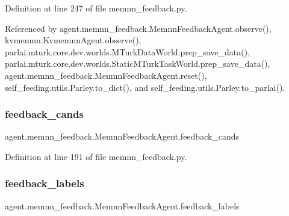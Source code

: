 Definition at line 247 of file memnn\+\_\+feedback.\+py.



Referenced by agent.\+memnn\+\_\+feedback.\+Memnn\+Feedback\+Agent.\+observe(), kvmemnn.\+Kvmemnn\+Agent.\+observe(), parlai.\+mturk.\+core.\+dev.\+worlds.\+M\+Turk\+Data\+World.\+prep\+\_\+save\+\_\+data(), parlai.\+mturk.\+core.\+dev.\+worlds.\+Static\+M\+Turk\+Task\+World.\+prep\+\_\+save\+\_\+data(), agent.\+memnn\+\_\+feedback.\+Memnn\+Feedback\+Agent.\+reset(), self\+\_\+feeding.\+utils.\+Parley.\+to\+\_\+dict(), and self\+\_\+feeding.\+utils.\+Parley.\+to\+\_\+parlai().

\mbox{\label{classagent_1_1memnn__feedback_1_1MemnnFeedbackAgent_afc6ac2b20a83a3b766a5dd985d591277}} 
\subsubsection{\texorpdfstring{feedback\+\_\+cands}{feedback\_cands}}
{\footnotesize\ttfamily agent.\+memnn\+\_\+feedback.\+Memnn\+Feedback\+Agent.\+feedback\+\_\+cands}



Definition at line 191 of file memnn\+\_\+feedback.\+py.

\mbox{\label{classagent_1_1memnn__feedback_1_1MemnnFeedbackAgent_a81ef3e328b096871c15c1a28df0d988e}} 
\subsubsection{\texorpdfstring{feedback\+\_\+labels}{feedback\_labels}}
{\footnotesize\ttfamily agent.\+memnn\+\_\+feedback.\+Memnn\+Feedback\+Agent.\+feedback\+\_\+labels}



